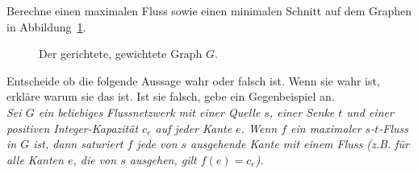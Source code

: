 \documentclass{uebung_cs}
\begin{document}
\begin{aufgabe}
    Berechne einen maximalen Fluss sowie einen minimalen Schnitt auf dem Graphen in Abbildung~\ref{Figure_4}.
    
    \begin{figure}[ht]
	\begin{center}
		\caption{\label{Figure_4}Der gerichtete, gewichtete Graph $G$.}
	\end{center}
\end{figure}
\end{aufgabe}

\begin{aufgabe}
    Entscheide ob die folgende Aussage wahr oder falsch ist. Wenn sie wahr ist, erkläre warum sie das ist. Ist sie falsch, gebe ein Gegenbeispiel an.\\
    \textit{Sei $G$ ein beliebiges Flussnetzwerk mit einer Quelle $s$, einer Senke $t$ und einer positiven Integer-Kapazität $c_e$ auf jeder Kante $e$. Wenn $f$ ein maximaler $s$-$t$-Fluss in $G$ ist, dann saturiert $f$ jede von $s$ ausgehende Kante mit einem Fluss (z.B. für alle Kanten $e$, die von $s$ ausgehen, gilt $f(e) = c_e$).}
\end{aufgabe}
\end{document}
